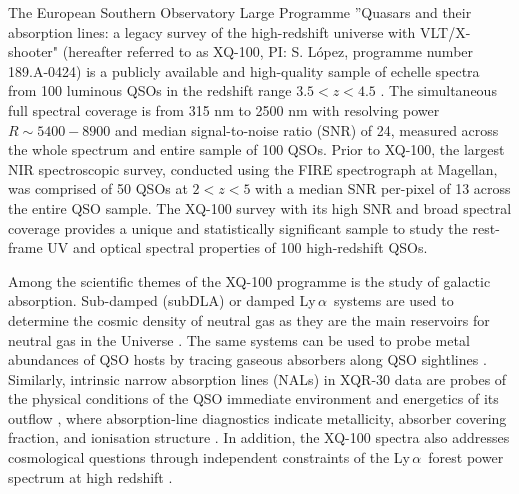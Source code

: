 \documentclass[fleqn,usenatbib]{mnras}
\newcommand{\lya}{Ly\,\textsc{$\alpha$}}
\begin{document}
The European Southern Observatory Large Programme ''Quasars and
their absorption lines: a legacy survey of the high-redshift universe with VLT/X-shooter" (hereafter referred to as XQ-100, PI: S. López, programme number 189.A-0424) is a publicly available and high-quality sample of echelle spectra from 100 luminous QSOs in the redshift range $3.5 < z < 4.5$ \citep{Lopez_2016_XQ100}. The simultaneous full spectral coverage is from 315 nm to 2500 nm with resolving power $R \sim 5400-8900$ and median signal-to-noise ratio (SNR) of 24, measured across the whole spectrum and entire sample of 100 QSOs. Prior to XQ-100, the largest NIR spectroscopic survey, conducted using the FIRE spectrograph at Magellan, was comprised of 50 QSOs at $2<z<5$ \citep{Matejek_2012} with a median SNR per-pixel of 13 across the entire QSO sample. The XQ-100 survey with its high SNR and broad spectral coverage provides a unique and statistically significant sample to study the rest-frame UV and optical spectral properties of 100 high-redshift QSOs. 

Among the scientific themes of the XQ-100 programme is the study of galactic absorption. Sub-damped (subDLA) or damped \lya\ systems \citep[DLA;][]{Wolfe_2005} are used to determine the cosmic density of neutral gas as they are the main reservoirs for neutral gas in the Universe \citep[e.g.,][]{Prochaska_2009, Noterdaeme_2012, Sanchez_2016, Berg_2019}. The same systems can be used to probe metal abundances of QSO hosts by tracing gaseous absorbers along QSO sightlines \citep{Berg_2016, Berg_2021}. Similarly, intrinsic narrow absorption lines (NALs) in XQR-30 data are probes of the physical conditions of the QSO immediate environment and energetics of its outflow \citep{Perrotta_2016}, where absorption-line diagnostics indicate metallicity, absorber covering fraction, and ionisation structure \citep{Perrotta_2018}. In addition, the XQ-100 spectra also addresses cosmological questions through independent constraints of the \lya\ forest power spectrum at high redshift \citep{Irsic_2017, Yeche_2017}.
\end{document}
